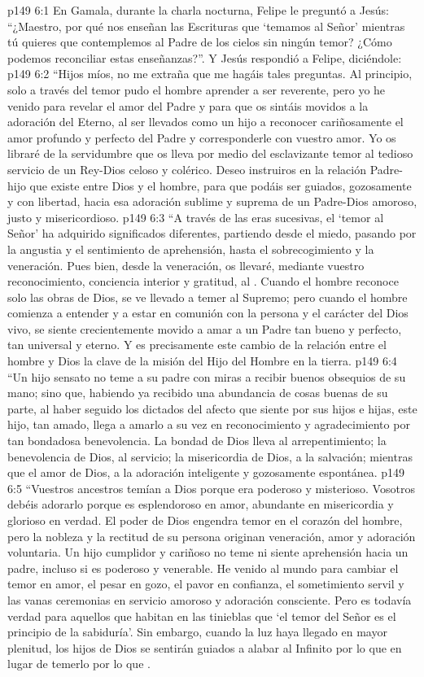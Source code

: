 \vs p149 6:1 En Gamala, durante la charla nocturna, Felipe le preguntó a Jesús: “¿Maestro, por qué nos enseñan las Escrituras que ‘temamos al Señor’ mientras tú quieres que contemplemos al Padre de los cielos sin ningún temor? ¿Cómo podemos reconciliar estas enseñanzas?”. Y Jesús respondió a Felipe, diciéndole:
\vs p149 6:2 \pc “Hijos míos, no me extraña que me hagáis tales preguntas. Al principio, solo a través del temor pudo el hombre aprender a ser reverente, pero yo he venido para revelar el amor del Padre y para que os sintáis movidos a la adoración del Eterno, al ser llevados como un hijo a reconocer cariñosamente el amor profundo y perfecto del Padre y corresponderle con vuestro amor. Yo os libraré de la servidumbre que os lleva por medio del esclavizante temor al tedioso servicio de un Rey\hyp{}Dios celoso y colérico. Deseo instruiros en la relación Padre\hyp{}hijo que existe entre Dios y el hombre, para que podáis ser guiados, gozosamente y con libertad, hacia esa adoración sublime y suprema de un Padre\hyp{}Dios amoroso, justo y misericordioso.
\vs p149 6:3 “A través de las eras sucesivas, el ‘temor al Señor’ ha adquirido significados diferentes, partiendo desde el miedo, pasando por la angustia y el sentimiento de aprehensión, hasta el sobrecogimiento y la veneración. Pues bien, desde la veneración, os llevaré, mediante vuestro reconocimiento, conciencia interior y gratitud, al . Cuando el hombre reconoce solo las obras de Dios, se ve llevado a temer al Supremo; pero cuando el hombre comienza a entender y a estar en comunión con la persona y el carácter del Dios vivo, se siente crecientemente movido a amar a un Padre tan bueno y perfecto, tan universal y eterno. Y es precisamente este cambio de la relación entre el hombre y Dios la clave de la misión del Hijo del Hombre en la tierra.
\vs p149 6:4 “Un hijo sensato no teme a su padre con miras a recibir buenos obsequios de su mano; sino que, habiendo ya recibido una abundancia de cosas buenas de su parte, al haber seguido los dictados del afecto que siente por sus hijos e hijas, este hijo, tan amado, llega a amarlo a su vez en reconocimiento y agradecimiento por tan bondadosa benevolencia. La bondad de Dios lleva al arrepentimiento; la benevolencia de Dios, al servicio; la misericordia de Dios, a la salvación; mientras que el amor de Dios, a la adoración inteligente y gozosamente espontánea.
\vs p149 6:5 “Vuestros ancestros temían a Dios porque era poderoso y misterioso. Vosotros debéis adorarlo porque es esplendoroso en amor, abundante en misericordia y glorioso en verdad. El poder de Dios engendra temor en el corazón del hombre, pero la nobleza y la rectitud de su persona originan veneración, amor y adoración voluntaria. Un hijo cumplidor y cariñoso no teme ni siente aprehensión hacia un padre, incluso si es poderoso y venerable. He venido al mundo para cambiar el temor en amor, el pesar en gozo, el pavor en confianza, el sometimiento servil y las vanas ceremonias en servicio amoroso y adoración consciente. Pero es todavía verdad para aquellos que habitan en las tinieblas que ‘el temor del Señor es el principio de la sabiduría’. Sin embargo, cuando la luz haya llegado en mayor plenitud, los hijos de Dios se sentirán guiados a alabar al Infinito por lo que  en lugar de temerlo por lo que .
